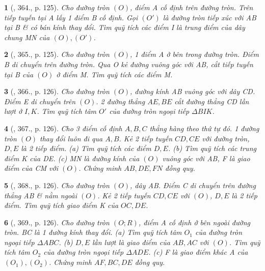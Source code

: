 \documentclass{article}
\newtheorem{baitoan}{}
\begin{document}
\begin{baitoan}[\cite{Binh_Toan_9_tap_2}, 364., p. 125]
	Cho đường tròn $(O)$, điểm A cố định trên đường tròn. Trên tiếp tuyến tại A lấy 1 điểm B cố định. Gọi $(O')$ là đường tròn tiếp xúc với AB tại B \& có bán kính thay đổi. Tìm quỹ tích các điểm I là trung điểm của dây chung MN của $(O),(O')$.
\end{baitoan}

\begin{baitoan}[\cite{Binh_Toan_9_tap_2}, 365., p. 125]
	Cho đường tròn $(O)$, 1 điểm A ở bên trong đường tròn. Điểm B di chuyển trên đường tròn. Qua O kẻ đường vuông góc với AB, cắt tiếp tuyến tại B của $(O)$ ở điểm M. Tìm quỹ tích các điểm M.
\end{baitoan}

\begin{baitoan}[\cite{Binh_Toan_9_tap_2}, 366., p. 126]
	Cho đường tròn $(O)$, đường kính AB vuông góc với dây CD. Điểm E di chuyển trên $(O)$. 2 đường thẳng $AE,BE$ cắt đường thẳng CD lần lượt ở $I,K$. Tìm quỹ tích tâm $O'$ của đường tròn ngoại tiếp $\Delta BIK$.
\end{baitoan}

\begin{baitoan}[\cite{Binh_Toan_9_tap_2}, 367., p. 126]
	Cho 3 điểm cố định $A,B,C$ thẳng hàng theo thứ tự đó. 1 đường tròn $(O)$ thay đổi luôn đi qua $A,B$. Kẻ 2 tiếp tuyến $CD,CE$ với đường tròn, $D,E$ là 2 tiếp điểm. (a) Tìm quỹ tích các điểm $D,E$. (b) Tìm quỹ tích các trung điểm K của DE. (c) MN là đường kính của $(O)$ vuông góc với AB, F là giao điểm của CM với $(O)$. Chứng minh $AB,DE,FN$ đồng quy.
\end{baitoan}

\begin{baitoan}[\cite{Binh_Toan_9_tap_2}, 368., p. 126]
	Cho đường tròn $(O)$, dây AB. Điểm C di chuyển trên đường thẳng AB \& nằm ngoài $(O)$. Kẻ 2 tiếp tuyến $CD,CE$ với $(O)$, $D,E$ là 2 tiếp điểm. Tìm quỹ tích giao điểm K của $OC,DE$.
\end{baitoan}

\begin{baitoan}[\cite{Binh_Toan_9_tap_2}, 369., p. 126]
	Cho đường tròn $(O;R)$, điểm A cố định ở bên ngoài đường tròn. BC là 1 đường kính thay đổi. (a) Tìm quỹ tích tâm $O_1$ của đường tròn ngoại tiếp $\Delta ABC$. (b) $D,E$ lần lượt là giao điểm của $AB,AC$ với $(O)$. Tìm quỹ tích tâm $O_2$ của đường tròn ngoại tiếp $\Delta ADE$. (c) F là giao điểm khác A của $(O_1),(O_2)$. Chứng minh $AF,BC,DE$ đồng quy.
\end{baitoan}
\end{document}
